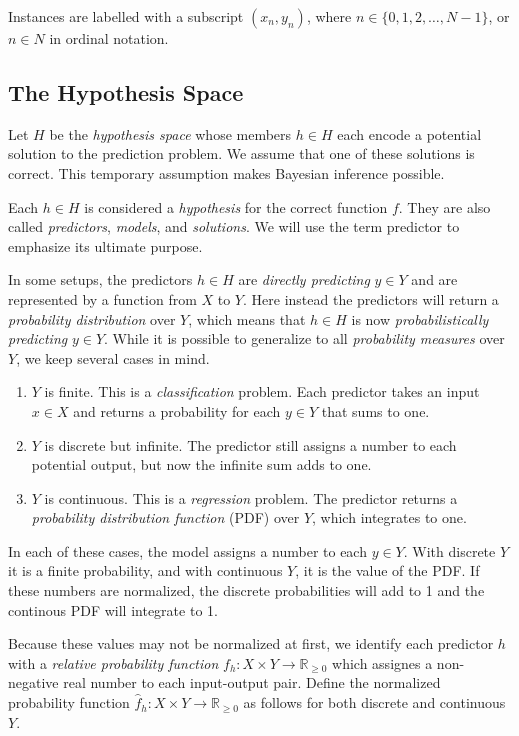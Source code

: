 \documentclass[twoside]{article}
\begin{document}
Instances are labelled with a subscript \((x_n, y_n)\), where \(n \in \{0, 1, 2,\ldots,N-1\}\), or \(n \in N\) in ordinal notation.

\subsection{The Hypothesis Space}

Let \(H\) be the \textit{hypothesis space} whose members \(h \in H\) each encode a potential solution to the prediction problem. We assume that one of these solutions is correct. This temporary assumption makes Bayesian inference possible.

Each \(h \in H\) is considered a \textit{hypothesis} for the correct function \(f\). They are also called \textit{predictors}, \textit{models}, and \textit{solutions}. We will use the term predictor to emphasize its ultimate purpose.

In some setups, the predictors \(h \in H\) are \textit{directly predicting} \(y \in Y\) and are represented by a function from \(X\) to \(Y\). Here instead the predictors will return a \textit{probability distribution} over \(Y\), which means that \(h \in H\) is now \textit{probabilistically predicting} \(y \in Y\). While it is possible to generalize to all \textit{probability measures} over \(Y\), we keep several cases in mind.

\begin{enumerate}
	\item \(Y\) is finite. This is a \textit{classification} problem. Each predictor takes an input \(x \in X\) and returns a probability for each \(y \in Y\) that sums to one.
	\item \(Y\) is discrete but infinite. The predictor still assigns a number to each potential output, but now the infinite sum adds to one.
	\item \(Y\) is continuous. This is a \textit{regression} problem. The predictor returns a \textit{probability distribution function} (PDF) over \(Y\), which integrates to one.
\end{enumerate}

In each of these cases, the model assigns a number to each \(y \in Y\). With discrete \(Y\) it is a finite probability, and with continuous \(Y\), it is the value of the PDF. If these numbers are normalized, the discrete probabilities will add to 1 and the continous PDF will integrate to 1.

Because these values may not be normalized at first, we identify each predictor \(h\) with a \textit{relative probability function} \(f_h: X \times Y \rightarrow \mathbb{R}_{\geq 0}\) which assignes a non-negative real number to each input-output pair. Define the normalized probability function \(\hat{f}_h: X \times Y \rightarrow \mathbb{R}_{\geq 0}\) as follows for both discrete and continuous \(Y\).
\end{document}
